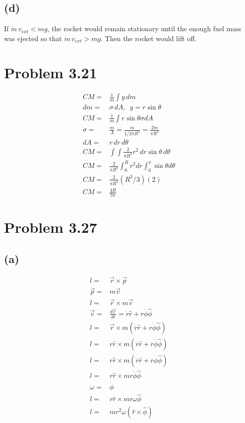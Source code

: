 \documentclass[12pt, a4paper]{article}
\begin{document}
\subsection*{(d)}
If $\dot{m}\,v_{ext} < mg$, the rocket would remain stationary
until the enough fuel mass was ejected so that $\dot{m}\,v_{ext} > mg$. 
Then the rocket would lift off. 






\section*{Problem 3.21}
\begin{align*}
CM =& \frac{1}{m}\int y \, dm 
\\
dm =& \sigma \, dA, \,\,\, y = r\sin\theta
\\
CM =& \frac{1}{m}\int r\sin\theta\sigma dA
\\
\sigma  =& \frac{m}{A} = \frac{m}{1/2\pi R^2} = \frac{2m}{\pi R^2}
\\
dA =& r \, dr  \, d\theta
\\
CM =& \int\int  \frac{2}{\pi R^2} r^2 \, dr \sin\theta  \, d\theta 
\\
CM =& \frac{2}{\pi R^2} \int_0^R r^2  dr  \int_0^{\pi} \sin\theta d\theta 
\\
CM =& \frac{2}{\pi R^2} (R^3/3) (2)
\\
CM =& \boxed{\frac{4R}{3\pi}}
\end{align*}






\section*{Problem 3.27}
\subsection*{(a)}
\begin{align*}
l =& \vec{r} \times \vec{p}
\\
\vec{p} =& m\vec{v}
\\
l =& \vec{r} \times m\vec{v}
\\
\vec{v} =& \frac{d\vec{r}}{dt} = \dot{r}\hat{r} + 
    r\dot{\phi}\hat{\phi}
\\
l =& \vec{r} \times m(\dot{r}\hat{r} + r\dot{\phi}\hat{\phi})
\\
l =& r\hat{r} \times m(\dot{r}\hat{r} + r\dot{\phi}\hat{\phi})
\\
l =& r\hat{r} \times m(\dot{r}\hat{r} + r\dot{\phi}\hat{\phi})
\\
l =& r\hat{r} \times m r\dot{\phi}\hat{\phi}
\\
\omega =& \dot{\phi}
\\
l =& r\hat{r} \times m r\omega\hat{\phi}
\\
l =&  \boxed{ m r^2\omega(\hat{r}\times\hat{\phi}) }
\end{align*}
\end{document}

